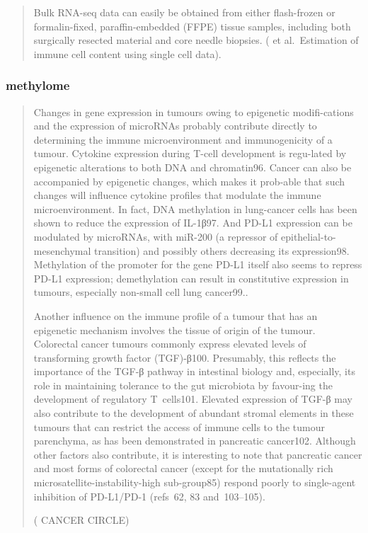 \documentclass[12pt,]{book}
\theoremstyle{definition}
\theoremstyle{definition}
\theoremstyle{definition}
\theoremstyle{remark}
\begin{document}
\begin{quote}
Bulk RNA-seq data can easily be obtained from either flash-frozen or
formalin-fixed, paraffin-embedded (FFPE) tissue samples, including both
surgically resected material and core needle biopsies. (\citet{Shelker}
et al.~Estimation of immune cell content using single cell data).
\end{quote}

\hypertarget{methylome}{%
\subsubsection{methylome}\label{methylome}}

\begin{quote}
Changes in gene expression in tumours owing to epigenetic modifi-cations
and the expression of microRNAs probably contribute directly to
determining the immune microenvironment and immunogenicity of a tumour.
Cytokine expression during T-cell development is regu-lated by
epigenetic alterations to both DNA and chromatin96. Cancer can also be
accompanied by epigenetic changes, which makes it prob-able that such
changes will influence cytokine profiles that modulate the immune
microenvironment. In fact, DNA methylation in lung-cancer cells has been
shown to reduce the expression of IL-1β97. And PD-L1 expression can be
modulated by microRNAs, with miR-200 (a repressor of
epithelial-to-mesenchymal transition) and possibly others decreasing its
expression98. Methylation of the promoter for the gene PD-L1 itself also
seems to repress PD-L1 expression; demethylation can result in
constitutive expression in tumours, especially non-small cell lung
cancer99..

Another influence on the immune profile of a tumour that has an
epigenetic mechanism involves the tissue of origin of the tumour.
Colorectal cancer tumours commonly express elevated levels of
transforming growth factor (TGF)-β100. Presumably, this reflects the
importance of the TGF-β pathway in intestinal biology and, especially,
its role in maintaining tolerance to the gut microbiota by favour-ing
the development of regulatory T~cells101. Elevated expression of TGF-β
may also contribute to the development of abundant stromal elements in
these tumours that can restrict the access of immune cells to the tumour
parenchyma, as has been demonstrated in pancreatic cancer102. Although
other factors also contribute, it is interesting to note that pancreatic
cancer and most forms of colorectal cancer (except for the mutationally
rich microsatellite-instability-high sub-group85) respond poorly to
single-agent inhibition of PD-L1/PD-1 (refs~62, 83 and~103--105).

(\citet{IMMUNE} CANCER CIRCLE)
\end{quote}
\end{document}
